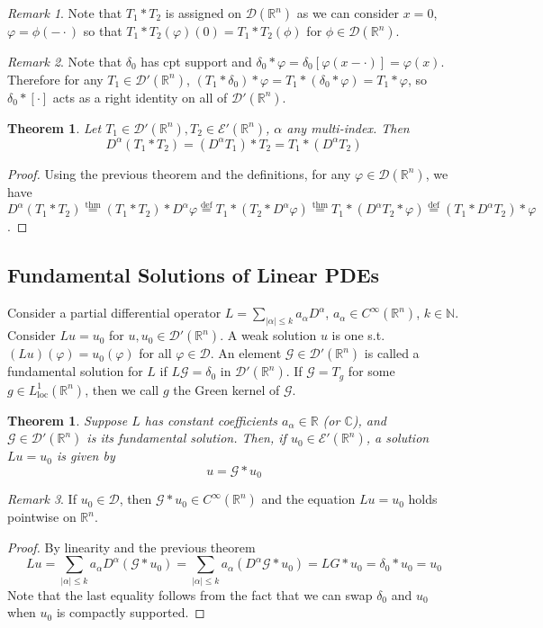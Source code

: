\documentclass{article}
\theoremstyle{definition}
\theoremstyle{remark}
\newtheorem{rem}{Remark}
\theoremstyle{plain}
\newtheorem{thm}[defn]{Theorem}
\newcommand{\NN}{\mathbb{N}}
\newcommand{\RR}{\mathbb{R}}
\newcommand{\CC}{\mathbb{C}}
\newcommand{\calD}{\mathcal{D}}
\begin{document}
\begin{rem}
    Note that $T_1\ast T_2$ is assigned on $\calD(\RR^n)$ as we can consider $x=0$, $\varphi=\phi(-\cdot)$ so that $T_1\ast T_2(\varphi)(0)=T_1\ast T_2(\phi)$ for $\phi\in\calD(\RR^n)$. 
\end{rem}
\begin{rem}
    Note that $\delta_0$ has cpt support and $\delta_0\ast\varphi=\delta_0[\varphi(x-\cdot)]=\varphi(x)$. Therefore for any $T_1\in\calD'(\RR^n)$, $(T_1\ast\delta_0)\ast\varphi=T_1\ast(\delta_0\ast\varphi)=T_1\ast\varphi$, so $\delta_0\ast[\cdot]$ acts as a right identity on all of $\calD'(\RR^n)$.
\end{rem}
\begin{thm}
    Let $T_1\in\calD'(\RR^n), T_2\in\mathcal E'(\RR^n)$, $\alpha$ any multi-index. Then \[D^\alpha(T_1\ast T_2)=(D^\alpha T_1)\ast T_2=T_1\ast(D^\alpha T_2)\]
\end{thm}
\begin{proof}
    Using the previous theorem and the definitions, for any $\varphi\in\calD(\RR^n)$, we have $D^\alpha(T_1\ast T_2)\overset{\text{thm}}{=}(T_1\ast T_2)\ast D^\alpha\varphi\overset{\text{def}}{=} T_1\ast (T_2\ast D^\alpha\varphi)\overset{\text{thm}}{=} T_1\ast(D^\alpha T_2\ast \varphi)\overset{\text{def}}{=}(T_1\ast D^\alpha T_2)\ast\varphi$.
\end{proof}
\subsection{Fundamental Solutions of Linear PDEs}
Consider a partial differential operator $L=\sum_{|\alpha|\le k}a_\alpha D^\alpha$, $a_\alpha\in C^\infty(\RR^n)$, $k\in\NN$. Consider $Lu=u_0$ for $u,u_0\in\calD'(\RR^n)$. A weak solution $u$ is one s.t. $(Lu)(\varphi)=u_0(\varphi)$ for all $\varphi\in\calD$.
An element $\mathcal G\in\calD'(\RR^n)$ is called a fundamental solution for $L$ if $L\mathcal G=\delta_0$ in $\calD'(\RR^n)$. If $\mathcal G= T_g$ for some $g\in L^1_{\text{loc}}(\RR^n)$, then we call $g$ the Green kernel of $\mathcal G$.
\begin{thm}
    Suppose $L$ has constant coefficients $a_\alpha\in\RR$ (or $\CC$), and $\mathcal G\in\calD'(\RR^n)$ is its fundamental solution. Then, if $u_0\in\mathcal E'(\RR^n)$, a solution $Lu=u_0$ is given by
    \[u=\mathcal G\ast u_0\]
\end{thm}
\begin{rem}
    If $u_0\in\mathcal D$, then $\mathcal G\ast u_0\in C^\infty(\RR^n)$ and the equation $Lu=u_0$ holds pointwise on $\RR^n$.
\end{rem}
\begin{proof}
    By linearity and the previous theorem
    \[Lu=\sum_{|\alpha|\le k}a_\alpha D^\alpha(\mathcal G\ast u_0)=\sum_{|\alpha|\le k}a_\alpha(D^\alpha\mathcal G\ast u_0)=LG\ast u_0=\delta_0\ast u_0=u_0\]
    Note that the last equality follows from the fact that we can swap $\delta_0$ and $u_0$ when $u_0$ is compactly supported.
\end{proof}
\end{document}
